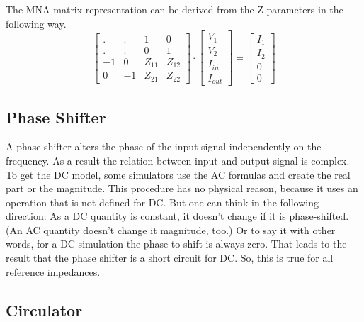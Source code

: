 The MNA matrix representation can be derived from the Z parameters in the
following way.
\begin{equation}
\begin{bmatrix}
 . & .  &  1 & 0\\
 . & .  &  0 & 1\\
-1 &  0 & Z_{11} & Z_{12}\\
 0 & -1 & Z_{21} & Z_{22}
\end{bmatrix}
\cdot
\begin{bmatrix}
V_{1}\\
V_{2}\\
I_{in}\\
I_{out}
\end{bmatrix}
=
\begin{bmatrix}
I_{1}\\
I_{2}\\
0\\
0
\end{bmatrix}
\end{equation}


\subsection{Phase Shifter}

A phase shifter alters the phase of the input signal independently on
the frequency.  As a result the relation between input and output
signal is complex.  To get the DC model, some simulators use the AC
formulas and create the real part or the magnitude.  This procedure
has no physical reason, because it uses an operation that is not
defined for DC.  But one can think in the following direction: As a DC
quantity is constant, it doesn't change if it is phase-shifted.  (An
AC quantity doesn't change it magnitude, too.)  Or to say it with
other words, for a DC simulation the phase to shift is always zero.
That leads to the result that the phase shifter is a short circuit for
DC.  So, this is true for all reference impedances.

\subsection{Circulator}

